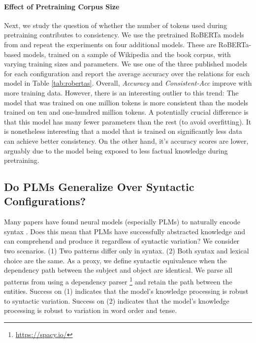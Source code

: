 


\paragraph{Effect of Pretraining Corpus Size}
Next, we study the question of whether the number of tokens used during pretraining contributes to consistency.
We use the pretrained RoBERTa models from \citet{robertas} and repeat the experiments on four additional models.
These are RoBERTa-based models, trained on a sample of Wikipedia and the book corpus, with varying training sizes and parameters. We use one of the three published models for each configuration and report the average accuracy over the relations for each model in Table \ref{tab:robertas}.
Overall, \textit{Accuracy} and
\textit{Consistent-Acc} improve
with more training data.
However, there is an interesting outlier to this trend:
The model that was trained on one million tokens is more consistent than the models trained on ten and one-hundred million tokens. A potentially crucial difference is that this model has many fewer parameters than the rest (to avoid overfitting). It is nonetheless interesting that a model that is trained on significantly less data can achieve better consistency. On the other hand, it's accuracy scores are lower, arguably due to the model being exposed to less factual knowledge during pretraining.


\subsection{Do PLMs Generalize Over Syntactic Configurations?} 

Many papers have found neural models (especially PLMs) to naturally
encode syntax
\cite{linzen2016assessing,belinkov2017neural,marvin-linzen-2018-targeted,belinkov2019analysis,yoav-syntax,hewitt2019structural}.
Does this mean that PLMs have successfully abstracted
knowledge and can comprehend and produce it regardless of
syntactic variation?
We consider two scenarios. (1) Two patterns differ only in
syntax. (2) Both syntax and lexical choice are the same.
As a proxy, we define syntactic equivalence when the dependency path between the subject and object are identical.
We parse all patterns from \resource{} using a dependency parser \cite{spacy}\footnote{\url{https://spacy.io/}} and retain the path between the entities.
Success on (1) indicates that the model's knowledge processing is robust to syntactic variation. Success on (2) indicates that the model's knowledge processing is robust to
variation in word order and tense.

